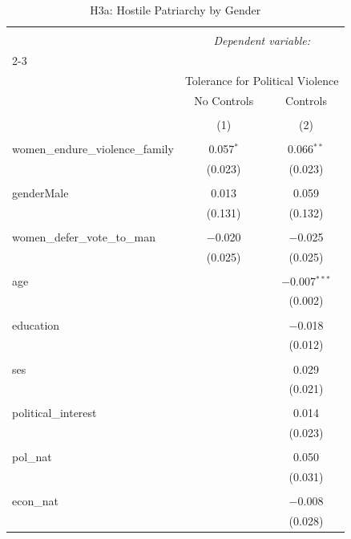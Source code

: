 
\begin{table}[!htbp] \centering 
  \caption{H3a: Hostile Patriarchy by Gender} 
  \label{} 
\begin{tabular}{@{\extracolsep{5pt}}lcc} 
\\[-1.8ex]\hline 
\hline \\[-1.8ex] 
 & \multicolumn{2}{c}{\textit{Dependent variable:}} \\ 
\cline{2-3} 
\\[-1.8ex] & \multicolumn{2}{c}{Tolerance for Political Violence} \\ 
 & No Controls & Controls \\ 
\\[-1.8ex] & (1) & (2)\\ 
\hline \\[-1.8ex] 
 women\_endure\_violence\_family & 0.057$^{*}$ & 0.066$^{**}$ \\ 
  & (0.023) & (0.023) \\ 
  & & \\ 
 genderMale & 0.013 & 0.059 \\ 
  & (0.131) & (0.132) \\ 
  & & \\ 
 women\_defer\_vote\_to\_man & $-$0.020 & $-$0.025 \\ 
  & (0.025) & (0.025) \\ 
  & & \\ 
 age &  & $-$0.007$^{***}$ \\ 
  &  & (0.002) \\ 
  & & \\ 
 education &  & $-$0.018 \\ 
  &  & (0.012) \\ 
  & & \\ 
 ses &  & 0.029 \\ 
  &  & (0.021) \\ 
  & & \\ 
 political\_interest &  & 0.014 \\ 
  &  & (0.023) \\ 
  & & \\ 
 pol\_nat &  & 0.050 \\ 
  &  & (0.031) \\ 
  & & \\ 
 econ\_nat &  & $-$0.008 \\ 
  &  & (0.028) \\ 

\end{tabular}
\end{table}
